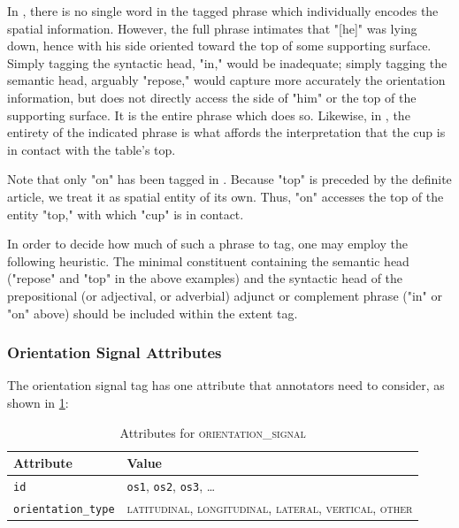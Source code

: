 \documentclass[11pt]{article}
\newenvironment{attributes}
{
\begin{tabular}{|l|l|}
    \hline \textbf{Attribute} & \textbf{Value}\\
}
{   \hline
\end{tabular}
}
\begin{document}
In , there is no single word in the tagged phrase which individually encodes the spatial information. However, the full phrase intimates that "[he]" was lying down, hence with his side oriented toward the top of some supporting surface. Simply tagging the syntactic head, "in," would be inadequate; simply tagging the semantic head, arguably "repose," would capture more accurately the orientation information, but does not directly access the side of "him" or the top of the supporting surface. It is the entire phrase which does so. Likewise, in , the entirety of the indicated phrase is what affords the interpretation that the cup is in contact with the table's top.

Note that only "on" has been tagged in . Because "top" is preceded by the definite article, we treat it as spatial entity of its own. Thus, "on" accesses the top of the entity "top," with which "cup" is in contact.

In order to decide how much of such a phrase to tag, one may employ the following heuristic. The minimal constituent containing the semantic head ("repose" and "top" in the above examples) and the syntactic head of the prepositional (or adjectival, or adverbial) adjunct or complement phrase ("in" or "on" above) should be included within the extent tag.


\subsubsection{Orientation Signal Attributes} %
\label{ssub:orientation_signal_attributes}

The orientation signal tag has one attribute that annotators need to consider, as shown in \cref{tab:orientation_signal}:

\begin{table}[h]
\centering
\begin{attributes}
    \hline \texttt{id}                  & \texttt{os1}, \texttt{os2}, 
                                          \texttt{os3}, \ldots\\
    \hline \texttt{orientation\_type}   & \textsc{latitudinal}, 
                                          \textsc{longitudinal}, 
                                          \textsc{lateral}, \textsc{vertical}, 
                                          \textsc{other}\\
\end{attributes}
\caption{Attributes for \textsc{orientation\_signal}}
\label{tab:orientation_signal}
\end{table}
\end{document}
